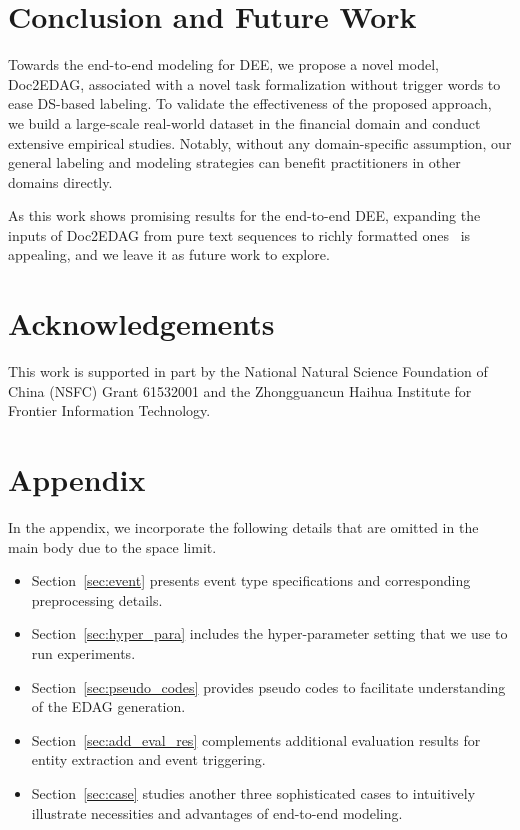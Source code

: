 \documentclass[11pt,a4paper]{article}
\begin{document}
\section{Conclusion and Future Work}
Towards the end-to-end modeling for DEE, we propose a novel model, Doc2EDAG, associated with a novel task formalization without trigger words to ease DS-based labeling.
To validate the effectiveness of the proposed approach, we build a large-scale real-world dataset in the financial domain and conduct extensive empirical studies.
Notably, without any domain-specific assumption, our general labeling and modeling strategies can benefit practitioners in other domains directly.

As this work shows promising results for the end-to-end DEE, expanding the inputs of Doc2EDAG from pure text sequences to richly formatted ones~\cite{wu2018fonduer} is appealing, and we leave it as future work to explore.

\section*{Acknowledgements}
This work is supported in part by the National Natural Science Foundation of China (NSFC) Grant 61532001 and the Zhongguancun Haihua Institute for Frontier Information Technology.

\balance



\newpage
\appendix

\section{Appendix}
\label{sec:appendix}

In the appendix, we incorporate the following details that are omitted in the main body due to the space limit.
\begin{itemize}
    \item Section~\ref{sec:event} presents event type specifications and corresponding preprocessing details.
    \item Section~\ref{sec:hyper_para} includes the hyper-parameter setting that we use to run experiments.
    \item Section~\ref{sec:pseudo_codes} provides pseudo codes to facilitate understanding of the EDAG generation.
    \item Section~\ref{sec:add_eval_res} complements additional evaluation results for entity extraction and event triggering.
    \item Section~\ref{sec:case} studies another three sophisticated cases to intuitively illustrate necessities and advantages of end-to-end modeling.
\end{itemize}
\end{document}
